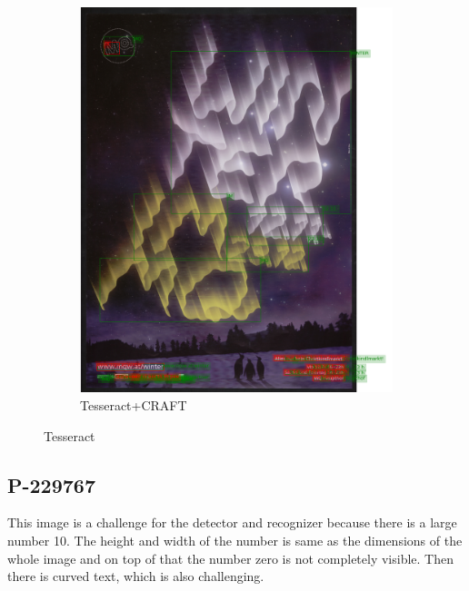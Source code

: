 \begin{figure}[hbtp!]
\begin{subfigure}{0.45\textwidth}
        \includegraphics[scale=0.3]{obrazky/plakaty/result_carfttesseract_vienna1_split_special_snesitive-73.png}
        \caption{Tesseract+CRAFT}
        \label{Im4:ex:craft}
    \end{subfigure}

    \caption{Tesseract}
    \label{Im4:ex:compl}
\end{figure}

\subsection*{P-229767}
This image is a challenge for the detector and recognizer because there is a large number 10. The height and width of the number is same as the dimensions of the whole image and on top of that the number zero is not completely visible. Then there is curved text, which is also challenging. 

